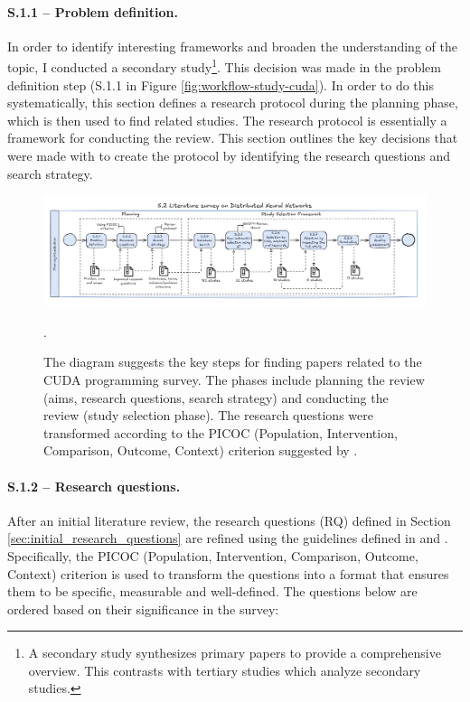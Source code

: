 \paragraph{S.1.1 -- Problem definition.}
In order to identify interesting frameworks and broaden the understanding of the topic, I conducted
a secondary study\footnote{A secondary study synthesizes primary papers to provide a comprehensive
	overview. This contrasts with tertiary studies which analyze secondary studies.}. This decision was
made in the problem definition step (S.1.1 in Figure \ref{fig:workflow-study-cuda}). In order to do
this systematically, this section defines a research protocol during the planning phase, which is
then used to find related studies. The research protocol is essentially a framework for conducting
the review. This section outlines the key decisions that were made with to create the protocol by
identifying the research questions and search strategy.

\begin{figure}[th]
	\centering
	\includegraphics[width=\linewidth]{figures/survey-cuda.pdf}
	\caption{The diagram suggests the key steps for finding papers related to the CUDA programming survey. The phases
		include planning the review (aims, research questions, search strategy) and conducting the review (study selection phase). The research questions
		were transformed according to the PICOC (Population, Intervention, Comparison, Outcome, Context) criterion suggested by \cite{keele_systematic_2007}.}.
	\label{fig:workflow-study-dnn}
\end{figure}

\paragraph{S.1.2 -- Research questions.}
After an initial literature review, the research questions (RQ) defined in Section
\ref{sec:initial_research_questions} are refined using the guidelines defined in
\cite{kitchenham_evidence-based_2015} and \cite{keele_systematic_2007}. Specifically, the PICOC
(Population, Intervention, Comparison, Outcome, Context) criterion is used to transform the
questions into a format that ensures them to be specific, measurable and well-defined. The
questions below are ordered based on their significance in the survey:

